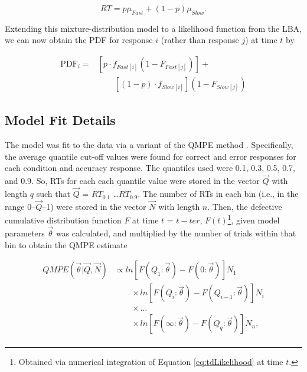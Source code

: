 \documentclass[a4paper, jou, natbib]{apa6}
\begin{document}
\begin{equation}
RT = p\mu_{Fast} + (1 - p)\mu_{Slow}.
\end{equation}

Extending this mixture-distribution model to a likelihood function from the LBA, we can now obtain the PDF for response $i$ (rather than response $j$) at time $t$ by 

\begin{equation}
\begin{aligned}
\mbox{PDF}_{i} = & \left[p \cdot f_{Fast[i]}(1 - F_{Fast[j]})\right] + \\ 
&\qquad \left[(1 - p) \cdot f_{Slow[i]}\right] (1 - F_{Slow[j]})
\end{aligned}
\label{eq:tdLikelihood}
\end{equation}

\subsection{Model Fit Details}
The model was fit to the data via a variant of the QMPE method \citep{Heathcote2002}. Specifically, the average quantile cut-off values were found for correct and error responses for each condition and accuracy response. The quantiles used were 0.1, 0.3, 0.5, 0.7, and 0.9. So, RTs for each each quantile value were stored in the vector $\vec{Q}$ with length $q$ such that $\vec{Q}$ = $RT_{0.1}$ \ldots $RT_{0.9}$. The number of RTs in each bin (i.e., in the range 0--$\vec{Q}$--1) were stored in the vector $\vec{N}$ with length $n$. Then, the defective cumulative distribution function $F$ at time $t$ = $t-ter$, $F(t)$\footnote{Obtained via numerical integration of Equation \ref{eq:tdLikelihood} at time $t$.}, given model parameters $\vec{\theta}$ was calculated, and multiplied by the number of trials within that bin to obtain the QMPE estimate 

\begin{equation}
\begin{aligned}
QMPE\left(\vec{\theta} | \vec{Q}, \vec{N}\right) & \propto ln\left[F\left(Q_{1}:\vec{\theta}\right) - F\left(0:\vec{\theta}\right)\right]N_{1} \\ 
& \qquad \times ln\left[F\left(Q_{i}:\vec{\theta}\right) - F\left(Q_{i - 1}:\vec{\theta}\right)\right]N_{i} \\
& \qquad \times \ldots \\
& \qquad \times ln\left[F\left(\infty:\vec{\theta}\right) - F\left(Q_{q}:\vec{\theta}\right)\right]N_{n}, \\
\end{aligned}
\label{eq:qmp}
\end{equation}
\end{document}
